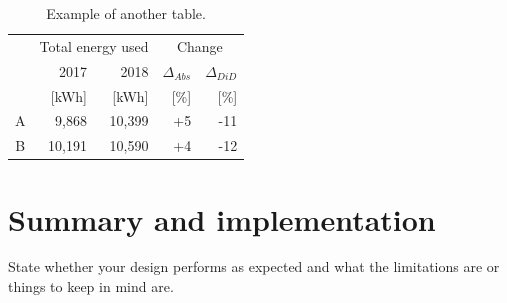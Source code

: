 \begin{table}
         \centering
        \footnotesize
        \caption{Example of another table.}

         \begin{tabular}{c@{\qquad}rrrr}
          \toprule
          \multirow{2}{*}{\raisebox{-\heavyrulewidth}{Schools }} & \multicolumn{2}{c}{Total energy used}& \multicolumn{2}{c}{Change}\\
          \cmidrule{2-5}
            & 2017 & 2018 & $\Delta_{Abs}$ & $\Delta_{DiD}$\\
            & [kWh] & [kWh] & [\%] & [\%] \\
          \midrule
          A & 9,868      & 10,399 & +5 & -11\\
          B & 10,191     & 10,590 & +4 & -12\\
          \bottomrule
        \end{tabular}
     \label{tab:table2}
\end{table}


\section{Summary and implementation}
State whether your design performs as expected and what the limitations are or things to keep in mind are. 


